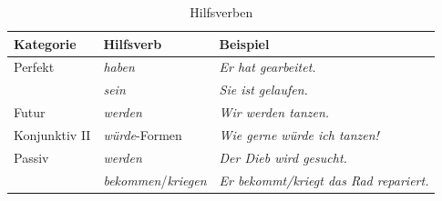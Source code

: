 \begin{table}[!htbp]
  \centering
  \begin{tabular}{l|l|l}
    \hline
    \hline 
    \textbf{Kategorie} & \textbf{Hilfsverb} & \textbf{Beispiel} \\
    \hline
    Perfekt & \textit{haben} & \textit{Er hat gearbeitet.}\\
    & \textit{sein} & \textit{Sie ist gelaufen.} \\
    Futur & \textit{werden} & \textit{Wir werden tanzen.}\\
    Konjunktiv II & \textit{würde}-Formen & \textit{Wie gerne würde ich tanzen!} \\ 
    Passiv & \textit{werden} & \textit{Der Dieb wird gesucht.}\\  
    & \textit{bekommen}/\textit{kriegen} & \textit{Er bekommt/kriegt das Rad repariert.}\\ 
    \hline 
    \hline 
  \end{tabular}
  \caption{Hilfsverben}
  \label{tab:Hilfsverben}
\end{table}